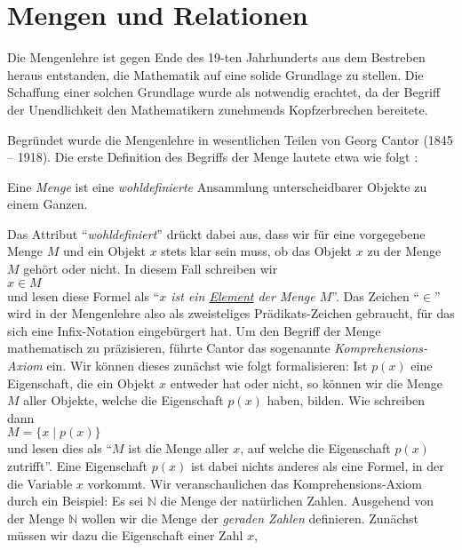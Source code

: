 \section{Mengen und Relationen}
Die Mengenlehre ist gegen Ende des 19-ten Jahrhunderts aus dem Bestreben heraus
entstanden, die Mathematik auf eine solide Grundlage zu stellen.  Die Schaffung einer
solchen Grundlage wurde als notwendig erachtet, da der Begriff der Unendlichkeit den
Mathematikern zunehmends Kopfzerbrechen bereitete.

Begr\"{u}ndet wurde die Mengenlehre in wesentlichen Teilen von Georg Cantor (1845 -- 1918).
Die erste Definition des Begriffs der Menge lautete etwa wie folgt \cite{cantor:1895}:
\begin{center}
Eine \emph{Menge} ist eine \emph{wohldefinierte} Ansammlung unterscheidbarer Objekte zu
  einem Ganzen.
\end{center}
Das Attribut ``\emph{wohldefiniert}'' dr\"{u}ckt dabei aus, dass wir f\"{u}r 
eine vorgegebene Menge $M$ und ein Objekt $x$ stets klar sein muss, ob das Objekt $x$
zu der Menge $M$ geh\"{o}rt oder nicht.  In diesem Fall schreiben wir \\[0.2cm]
\hspace*{1.3cm} $x \in M$ \\[0.2cm]
und lesen diese Formel als ``\emph{$x$ ist ein \underline{Element} der Menge $M$}''.
Das Zeichen ``$\in$'' wird in der Mengenlehre also als zweisteliges Pr\"{a}dikats-Zeichen
gebraucht, f\"{u}r das sich eine Infix-Notation eingeb\"{u}rgert hat.
Um den Begriff der Menge mathematisch zu
pr\"{a}zisieren, f\"{u}hrte Cantor das sogenannte \emph{Komprehensions-Axiom} ein.
Wir k\"{o}nnen dieses zun\"{a}chst wie folgt formalisieren: Ist $p(x)$ eine Eigenschaft, die
ein Objekt $x$ entweder hat oder nicht, so k\"{o}nnen wir die Menge $M$ aller Objekte, welche die
Eigenschaft $p(x)$ haben, bilden.  Wie schreiben dann \\[0.2cm]
\hspace*{1.3cm} $M = \{ x \;|\; p(x) \}$ \\[0.2cm]
und lesen dies als ``$M$ ist die Menge aller $x$, auf welche die Eigenschaft $p(x)$ zutrifft''.
Eine Eigenschaft $p(x)$ ist dabei nichts anderes als eine Formel, in der die Variable $x$
vorkommt.
Wir veranschaulichen das Komprehensions-Axiom durch ein Beispiel:  Es sei $\mathbb{N}$
die Menge der nat\"{u}rlichen Zahlen. Ausgehend von der Menge $\mathbb{N}$  wollen wir die
Menge der \emph{geraden Zahlen} definieren. Zun\"{a}chst m\"{u}ssen wir dazu die Eigenschaft einer
Zahl $x$,
